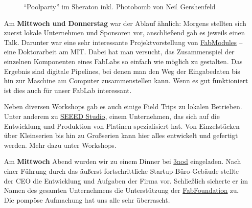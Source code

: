 \documentclass{\basedir/fablab-document}
\begin{document}
\begin{figure}[h]
	\noindent{}
	\caption{``Poolparty'' im Sheraton inkl. Photobomb von Neil Gershenfeld}
	\label{photobomb-neil}
\end{figure}

Am \textbf{Mittwoch und Donnerstag} war der Ablauf ähnlich: Morgens
stellten sich zuerst lokale Unternehmen und Sponsoren vor, anschließend
gab es jeweils einen Talk. Darunter war eine sehr interessante
Projektvorstellung von \href{http://fabmodules.org/}{FabModules} -- eine
Doktorarbeit am MIT. Dabei hat man versucht, das Zusammenspiel der
einzelnen Komponenten eines FabLabs so einfach wie möglich zu gestalten.
Das Ergebnis sind digitale Pipelines, bei denen man den Weg der
Eingabedaten bis hin zur Maschine am Computer zusammenstellen kann. Wenn
es gut funktioniert ist dies auch für unser FabLab interessant.

Neben diversen Workshops gab es auch einige Field Trips zu lokalen
Betrieben. Unter anderem zu \href{https://www.seeedstudio.com/}{SEEED
Studio}, einem Unternehmen, das sich auf die Entwicklung und Produktion
von Platinen spezialisiert hat. Von Einzelstücken über Kleinserien bis
hin zu Großserien kann hier alles entwickelt und gefertigt werden. Mehr
dazu unter Workshops.

Am \textbf{Mittwoch} Abend wurden wir zu einem Dinner bei
\href{https://www.3nod.com.cn/en/}{3nod} eingeladen. Nach einer
Führung durch das äußerst fortschrittliche Startup-Büro-Gebäude stellte
der CEO die Entwicklung und Aufgaben der Firma vor.
Schließlich sicherte er im Namen des gesamten Unternehmens die
Unterstützung der \href{https://fabfoundation.org/}{FabFoundation} zu.
Die pompöse Aufmachung hat uns alle sehr überrascht.
\end{document}
